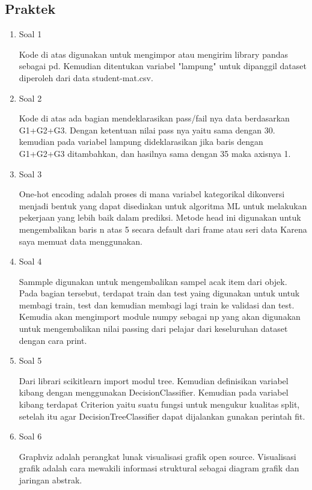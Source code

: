 \subsection{Praktek}
\begin{enumerate}
	\item Soal 1
	\hfill\break
	
	Kode di atas digunakan untuk mengimpor atau mengirim library pandas sebagai pd. Kemudian ditentukan variabel "lampung" untuk dipanggil dataset diperoleh dari data student-mat.csv. 
	
	\item Soal 2
	\hfill\break
	
	Kode di atas ada bagian mendeklarasikan pass/fail nya data berdasarkan G1+G2+G3. Dengan ketentuan nilai pass nya yaitu sama dengan 30. kemudian pada variabel lampung dideklarasikan jika baris dengan G1+G2+G3 ditambahkan, dan hasilnya sama dengan 35 maka axisnya 1.
	
	\item Soal 3
	\hfill\break
	
	One-hot encoding adalah proses di mana variabel kategorikal dikonversi menjadi bentuk yang dapat disediakan untuk algoritma ML untuk melakukan pekerjaan yang lebih baik dalam prediksi. Metode head ini digunakan untuk mengembalikan baris n atas 5 secara default dari frame atau seri data Karena saya memuat data menggunakan. 

	\item Soal 4
	\hfill\break
	
	Sammple digunakan untuk mengembalikan sampel acak item dari objek. Pada bagian tersebut, terdapat train dan test yaing digunakan untuk untuk membagi train, test dan kemudian membagi lagi train ke validasi dan test. Kemudia akan mengimport module numpy sebagai np yang akan digunakan untuk mengembalikan nilai passing dari pelajar dari keseluruhan dataset dengan cara print.

	\item Soal 5
	\hfill\break
	
	Dari librari scikitlearn import modul tree. Kemudian definisikan variabel kibang dengan menggunakan DecisionClassifier. Kemudian pada variabel kibang terdapat Criterion yaitu suatu fungsi untuk mengukur kualitas split, setelah itu agar DecisionTreeClassifier dapat dijalankan gunakan perintah fit.

	\item Soal 6
	\hfill\break
	
	Graphviz adalah perangkat lunak visualisasi grafik open source. Visualisasi grafik adalah cara mewakili informasi struktural sebagai diagram grafik dan jaringan abstrak.


\end{enumerate}
